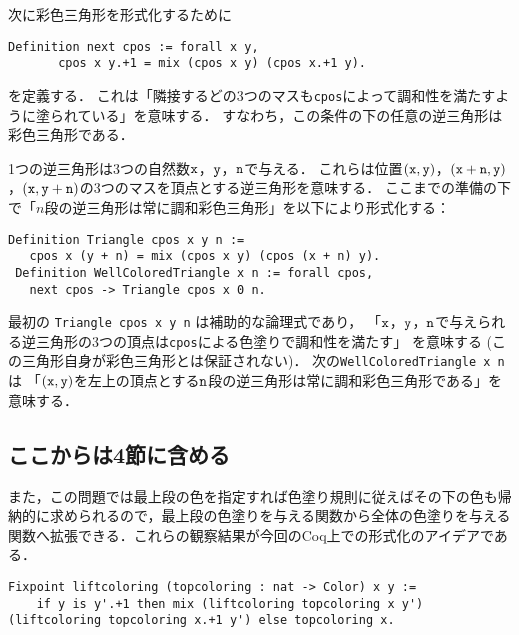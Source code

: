 次に彩色三角形を形式化するために
\begin{lstlisting}[language=Coq]
 Definition next cpos := forall x y,
       cpos x y.+1 = mix (cpos x y) (cpos x.+1 y).
\end{lstlisting}
を定義する．
これは「隣接するどの3つのマスも{\tt cpos}によって調和性を満たすように塗られている」を意味する．
すなわち，この条件の下の任意の逆三角形は彩色三角形である．

1つの逆三角形は3つの自然数${\tt x}$，${\tt y}$，${\tt n}$で与える．
これらは位置$({\tt x},{\tt y})$，$({\tt x}+{\tt n},{\tt y})$，$({\tt x},{\tt y}+{\tt n})$の3つのマスを頂点とする逆三角形を意味する．
ここまでの準備の下で「$n$段の逆三角形は常に調和彩色三角形」を以下により形式化する：
\begin{lstlisting}[language=Coq]
 Definition Triangle cpos x y n :=
   cpos x (y + n) = mix (cpos x y) (cpos (x + n) y).
 Definition WellColoredTriangle x n := forall cpos,
   next cpos -> Triangle cpos x 0 n.
\end{lstlisting}
最初の {\tt Triangle cpos x y n} は補助的な論理式であり，
「${\tt x}$，${\tt y}$，${\tt n}$で与えられる逆三角形の3つの頂点は{\tt cpos}による色塗りで調和性を満たす」
を意味する (この三角形自身が彩色三角形とは保証されない)．
次の{\tt WellColoredTriangle x n} は
「$({\tt x},{\tt y})$を左上の頂点とする${\tt n}$段の逆三角形は常に調和彩色三角形である」を意味する．








\subsection{ここからは4節に含める}



また，この問題では最上段の色を指定すれば色塗り規則に従えばその下の色も帰納的に求められるので，最上段の色塗りを与える関数から全体の色塗りを与える関数へ拡張できる．これらの観察結果が今回のCoq上での形式化のアイデアである．

\begin{lstlisting}[language=Coq]
  Fixpoint liftcoloring (topcoloring : nat -> Color) x y :=
    if y is y'.+1 then mix (liftcoloring topcoloring x y') (liftcoloring topcoloring x.+1 y') else topcoloring x.
\end{lstlisting}



